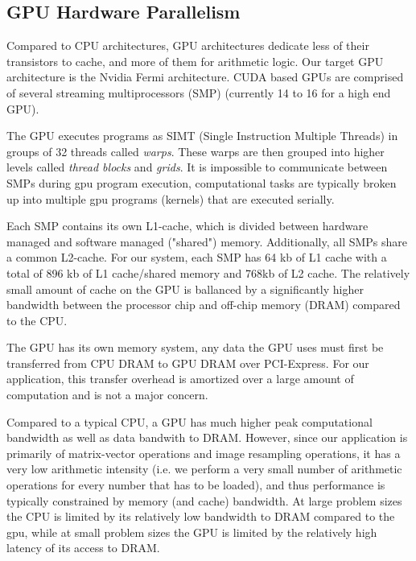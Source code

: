 \documentclass[10pt,twocolumn,letterpaper]{article}
\begin{document}
\subsection{GPU Hardware Parallelism}
Compared to CPU architectures, GPU architectures dedicate less of their transistors
to cache, and more of them for arithmetic logic. Our target GPU architecture
is the Nvidia Fermi architecture.  CUDA based GPUs are comprised of several 
streaming multiprocessors (SMP) (currently 14 to 16 for a high end GPU).

The GPU executes programs as SIMT (Single Instruction Multiple Threads) in
groups of 32 threads called \emph{warps}.  These warps are then grouped into
higher levels called \emph{thread blocks} and \emph{grids}.  It is impossible
to communicate between SMPs during gpu program execution, computational tasks
are typically broken up into multiple gpu programs (kernels) that are executed
serially.  

Each SMP contains its own L1-cache, which is divided between hardware managed
and software managed ("shared") memory.  Additionally, all SMPs share a common
L2-cache.  For our system, each SMP has 64 kb of L1 cache with a total of 896
kb of L1 cache/shared memory and 768kb of L2 cache. The relatively small
amount of cache on the GPU is ballanced by a significantly higher bandwidth between the
processor chip and off-chip memory (DRAM) compared to the CPU.  

The GPU has its own memory system, any data the GPU uses must first be
transferred from CPU DRAM to GPU DRAM over PCI-Express.  For our application,
this transfer overhead is amortized over a large amount of computation and is
not a major concern.

Compared to a typical CPU, a GPU has much higher peak computational bandwidth
as well as data bandwith to DRAM.  However, since our application is primarily
of matrix-vector operations and image resampling operations, it has a very low
arithmetic intensity (i.e. we perform a very small number of arithmetic
operations for every number that has to be loaded), and thus performance is
typically constrained by memory (and cache) bandwidth.  At large problem sizes
the CPU is limited by its relatively low bandwidth to DRAM compared to the gpu,
while at small problem sizes the GPU is limited by the relatively high latency
of its access to DRAM. 
\end{document}
